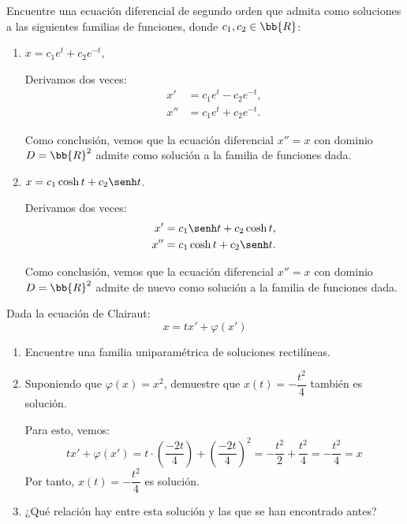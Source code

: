 \begin{ejercicio}
    Encuentre una ecuación diferencial de segundo orden que admita como soluciones a las siguientes familias de funciones, donde \(c_1, c_2 \in \bb{R}\):
    \begin{enumerate}
        \item \(x = c_1e^t + c_2e^{-t}\),
        
        Derivamos dos veces:
        \begin{align*}
            x' &= c_1e^t - c_2e^{-t},\\
            x'' &= c_1e^t + c_2e^{-t}.
        \end{align*}

        Como conclusión, vemos que la ecuación diferencial $x''=x$ con dominio $D=\bb{R}^2$ admite como solución a la familia de funciones dada.
        \item \(x = c_1\cosh t + c_2\senh t\).
        
        Derivamos dos veces:
        \begin{align*}
            x' &= c_1\senh t + c_2\cosh t,\\
            x'' &= c_1\cosh t + c_2\senh t.
        \end{align*}

        Como conclusión, vemos que la ecuación diferencial $x''=x$ con dominio $D=\bb{R}^2$ admite de nuevo como solución a la familia de funciones dada.
    \end{enumerate}
\end{ejercicio}


\begin{ejercicio}
    Dada la ecuación de Clairaut:
    \begin{equation*}
        x = tx' + \varphi(x')
    \end{equation*}
    \begin{enumerate}
        \item Encuentre una familia uniparamétrica de soluciones rectilíneas.
        \item Suponiendo que \(\varphi(x) = x^2\), demuestre que \(x(t) = -\dfrac{t^2}{4}\) también es solución.
        
        Para esto, vemos:
        \begin{equation*}
            tx'+\varphi(x') = t\cdot \left(\dfrac{-2t}{4}\right) + \left(\dfrac{-2t}{4}\right)^2 = -\dfrac{t^2}{2} + \dfrac{t^2}{4} = -\dfrac{t^2}{4} = x
        \end{equation*}
        Por tanto, \(x(t) = -\dfrac{t^2}{4}\) es solución.
        \item ¿Qué relación hay entre esta solución y las que se han encontrado antes?
    \end{enumerate}
\end{ejercicio}

